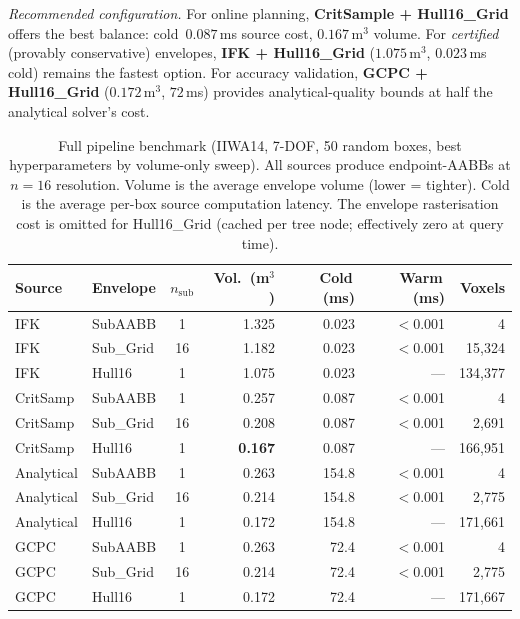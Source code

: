 \documentclass[journal]{IEEEtran}
\begin{document}
\emph{Recommended configuration.}
For online planning, \textbf{CritSample + Hull16\_Grid}
offers the best balance:
cold~$0.087$\,ms source cost, $0.167$\,m$^3$ volume.
For \emph{certified} (provably conservative) envelopes,
\textbf{IFK + Hull16\_Grid} ($1.075$\,m$^3$, $0.023$\,ms cold)
remains the fastest option.
For accuracy validation,
\textbf{GCPC + Hull16\_Grid} ($0.172$\,m$^3$, $72$\,ms)
provides analytical-quality bounds at half the analytical
solver's cost.

\begin{table}[t]
\centering
\caption{Full pipeline benchmark (IIWA14, 7-DOF, 50 random boxes,
best hyperparameters by volume-only sweep).
All sources produce endpoint-AABBs at $n{=}16$ resolution.
Volume is the average envelope volume (lower = tighter).
Cold is the average per-box source computation latency.
The envelope rasterisation cost is omitted for Hull16\_Grid
(cached per tree node; effectively zero at query time).}
\label{tab:pipeline}
\setlength{\tabcolsep}{2.5pt}
\small
\begin{tabular}{@{}llcrrrr@{}}
\toprule
Source & Envelope & $n_\text{sub}$
  & \!\!Vol.\ (m$^3$)\!\! & \!Cold\,(ms)\! & \!Warm\,(ms)\! & Voxels \\
\midrule
IFK          & SubAABB     &  1 & 1.325 &   0.023 & $<$0.001 & 4 \\
IFK          & Sub\_Grid   & 16 & 1.182 &   0.023 &  $<$0.001 & 15{,}324 \\
IFK          & Hull16      &  1 & 1.075 &   0.023 &  --- & 134{,}377 \\
\midrule
CritSamp     & SubAABB     &  1 & 0.257 &   0.087 & $<$0.001 & 4 \\
CritSamp     & Sub\_Grid   & 16 & 0.208 &   0.087 &  $<$0.001 & 2{,}691 \\
CritSamp     & Hull16      &  1 & \textbf{0.167} &   0.087 &  --- & 166{,}951 \\
\midrule
Analytical   & SubAABB     &  1 & 0.263 & 154.8\phantom{0}   & $<$0.001 & 4 \\
Analytical   & Sub\_Grid   & 16 & 0.214 & 154.8\phantom{0}   &  $<$0.001 & 2{,}775 \\
Analytical   & Hull16      &  1 & 0.172 & 154.8\phantom{0}   &  --- & 171{,}661 \\
\midrule
GCPC         & SubAABB     &  1 & 0.263 &  72.4\phantom{0}   & $<$0.001 & 4 \\
GCPC         & Sub\_Grid   & 16 & 0.214 &  72.4\phantom{0}   &  $<$0.001 & 2{,}775 \\
GCPC         & Hull16      &  1 & 0.172 &  72.4\phantom{0}   &  --- & 171{,}667 \\
\bottomrule
\end{tabular}
\end{table}
\end{document}
